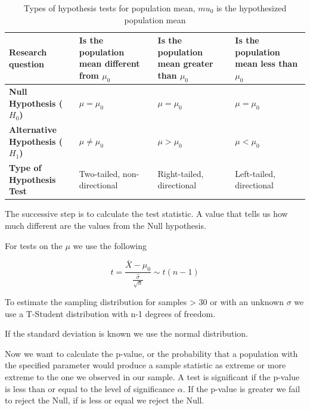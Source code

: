 \begin{table}[H]
\centering
\begin{tabular}{|p{3cm}|p{3.5cm}|p{3.5cm}|p{3.5cm}|}
\hline
\textbf{Research question} & Is the population mean \newline different from $\mu_0$ & Is the population mean \newline greater than $\mu_0$ & Is the population mean \newline less than $\mu_0$ \\
\hline
\textbf{Null Hypothesis ($H_0$)} & $\mu = \mu_0$ & $\mu = \mu_0$ & $\mu = \mu_0$ \\
\hline
\textbf{Alternative Hypothesis ($H_1$)} & $\mu \neq \mu_0$ & $\mu > \mu_0$ & $\mu < \mu_0$ \\
\hline
\textbf{Type of Hypothesis Test} & Two-tailed, \newline non-directional & Right-tailed, \newline directional & Left-tailed, \newline directional \\
\hline
\end{tabular}
\caption{Types of hypothesis tests for population mean, $mu_0$ is the hypothesized population mean}
\end{table}

\vspace{10pt}

The successive step is to calculate the test statistic. A value that tells us how much different are the values from the Null hypothesis.

For tests on the $\mu$ we use the following

\begin{equation*}
    t = \frac{\bar{X}-\mu_0}{\frac{\hat{\sigma}}{\sqrt{n}}} \sim t(n-1)
\end{equation*}


\vspace{10pt}

To estimate the sampling distribution for samples > 30 or with an unknown $\sigma$ we use a T-Student distribution with n-1 degrees of freedom.

If the standard deviation is known we use the normal distribution.

\vspace{10pt}

Now we want to calculate the p-value, or the probability that a population with the specified parameter would produce a sample statistic as extreme or more extreme to the one we observed in our sample. 
A test is significant if the p-value is less than or equal to the level of significance $\alpha$. If the p-value is greater we fail to reject the Null, if is less or equal we reject the Null.

